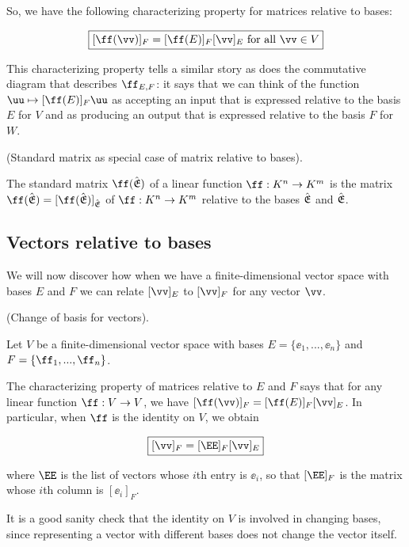 \begin{deriv}
    So, we have the following characterizing property for matrices relative to bases:
    
    \begin{align*}
        \boxed
        {
            [\ff(\vv)]_F = [\ff(E)]_F [\vv]_E \text{ for all $\vv \in V$}
        }
    \end{align*}
    
    This characterizing property tells a similar story as does the commutative diagram that describes $\ff_{E,F}$: it says that we can think of the function $\uu \mapsto [\ff(E)]_F \uu$ as accepting an input that is expressed relative to the basis $E$ for $V$ and as producing an output that is expressed relative to the basis $F$ for $W$.
\end{deriv}

\begin{remark}
\label{ch::lin_alg::rmk::standard_matrix_as_matrix_wrt_bases}
    (Standard matrix as special case of matrix relative to bases). 
    
    The standard matrix $\ff(\sE)$ of a linear function $\ff:K^n \rightarrow K^m$ is the matrix $\ff(\sE) = [\ff(\sE)]_\sE$ of $\ff:K^n \rightarrow K^m$ relative to the bases ${\hat{\mathfrak{E}}}$ and ${\hat{\mathfrak{E}}}$.
\end{remark}

\newpage

\subsection*{Vectors relative to bases}

We will now discover how when we have a finite-dimensional vector space with bases $E$ and $F$ we can relate $[\vv]_E$ to $[\vv]_F$ for any vector $\vv$.

\begin{theorem}
    \label{ch::lin_alg::thm::change_of_basis_for_vectors}
    
    (Change of basis for vectors).
    
    Let $V$ be a finite-dimensional vector space with bases $E = \{\ee_1, ..., \ee_n\}$ and $F = \{\ff_1, ..., \ff_n\}$. 
    
    The characterizing property of matrices relative to $E$ and $F$ says that for any linear function $\ff:V \rightarrow V$, we have $[\ff(\vv)]_F = [\ff(E)]_F [\vv]_E$. In particular, when $\ff$ is the identity on $V$, we obtain
    
    \begin{align*}
        \boxed
        {
            [\vv]_F = [\EE]_F [\vv]_E
        }
    \end{align*}
    
    where $\EE$ is the list of vectors whose $i$th entry is $\ee_i$, so that $[\EE]_F$ is the matrix whose $i$th column is $[\ee_i]_F$.
    
    It is a good sanity check that the identity on $V$ is involved in changing bases, since representing a vector with different bases does not change the vector itself.
\end{theorem}

